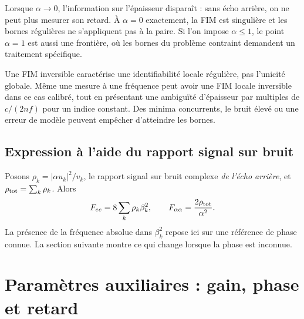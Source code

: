 \documentclass[11pt,a4paper]{article}
\begin{document}
Lorsque $\alpha\to0$, l'information sur l'épaisseur disparaît : sans écho
arrière, on ne peut plus mesurer son retard. À $\alpha=0$ exactement, la
FIM est singulière et les bornes régulières ne s'appliquent pas à la paire.
Si l'on impose $\alpha\leq1$, le point $\alpha=1$ est aussi une frontière,
où les bornes du problème contraint demandent un traitement spécifique.

Une FIM inversible caractérise une identifiabilité locale régulière, pas
l'unicité globale. Même une mesure à une fréquence peut avoir une FIM locale
inversible dans ce cas calibré, tout en présentant une ambiguïté d'épaisseur
par multiples de $c/(2nf)$ pour un indice constant. Des minima concurrents,
le bruit élevé ou une erreur de modèle peuvent empêcher d'atteindre les bornes.

\subsection{Expression à l'aide du rapport signal sur bruit}
Posons $\rho_k=|\alpha u_k|^2/v_k$, le rapport signal sur bruit complexe
\emph{de l'écho arrière}, et $\rho_{\rm tot}=\sum_k\rho_k$. Alors
\begin{equation}
 F_{ee}=8\sum_k\rho_k\beta_k^2,\qquad
 F_{\alpha\alpha}=\frac{2\rho_{\rm tot}}{\alpha^2}.
\end{equation}
La présence de la fréquence absolue dans $\beta_k^2$ repose ici sur une
référence de phase connue. La section suivante montre ce qui change lorsque
la phase est inconnue.

\section{Paramètres auxiliaires : gain, phase et retard}
\end{document}
